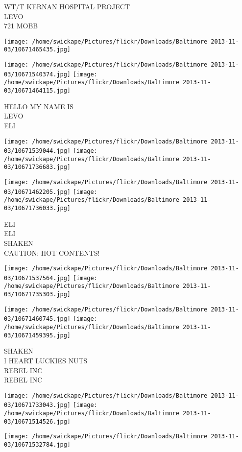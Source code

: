\documentclass[10pt,letterpaper]{article}
\begin{document}
WT/T KERNAN HOSPITAL PROJECT\\
LEVO\\
721 MOBB
\pagebreak

\texttt{[image: /home/swickape/Pictures/flickr/Downloads/Baltimore 2013-11-03/10671465435.jpg]}

\vspace{0.25in}
\texttt{[image: /home/swickape/Pictures/flickr/Downloads/Baltimore 2013-11-03/10671540374.jpg]}
\texttt{[image: /home/swickape/Pictures/flickr/Downloads/Baltimore 2013-11-03/10671464115.jpg]}

HELLO MY NAME IS\\
LEVO\\
ELI
\pagebreak

\texttt{[image: /home/swickape/Pictures/flickr/Downloads/Baltimore 2013-11-03/10671539044.jpg]}
\texttt{[image: /home/swickape/Pictures/flickr/Downloads/Baltimore 2013-11-03/10671736683.jpg]}

\texttt{[image: /home/swickape/Pictures/flickr/Downloads/Baltimore 2013-11-03/10671462205.jpg]}
\texttt{[image: /home/swickape/Pictures/flickr/Downloads/Baltimore 2013-11-03/10671736033.jpg]}

ELI\\
ELI\\
SHAKEN\\
CAUTION: HOT CONTENTS!
\pagebreak

\texttt{[image: /home/swickape/Pictures/flickr/Downloads/Baltimore 2013-11-03/10671537564.jpg]}
\texttt{[image: /home/swickape/Pictures/flickr/Downloads/Baltimore 2013-11-03/10671735303.jpg]}

\texttt{[image: /home/swickape/Pictures/flickr/Downloads/Baltimore 2013-11-03/10671460745.jpg]}
\texttt{[image: /home/swickape/Pictures/flickr/Downloads/Baltimore 2013-11-03/10671459395.jpg]}

SHAKEN\\
I HEART LUCKIES NUTS\\
REBEL INC\\
REBEL INC
\pagebreak

\texttt{[image: /home/swickape/Pictures/flickr/Downloads/Baltimore 2013-11-03/10671733043.jpg]}
\texttt{[image: /home/swickape/Pictures/flickr/Downloads/Baltimore 2013-11-03/10671514526.jpg]}

\vspace{0.25in}
\texttt{[image: /home/swickape/Pictures/flickr/Downloads/Baltimore 2013-11-03/10671532784.jpg]}
\end{document}
